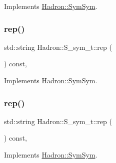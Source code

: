Implements \mbox{\hyperlink{structHadron_1_1SymSym_ae57780f41b9f6c03c6056eed3677bd48}{Hadron\+::\+Sym\+Sym}}.

\mbox{\label{structHadron_1_1S__sym__t_a1a8ccb60f6d70c9a00b8683ad8eac195}} 
\subsubsection{\texorpdfstring{rep()}{rep()}\hspace{0.1cm}{\footnotesize\ttfamily [1/5]}}
{\footnotesize\ttfamily std\+::string Hadron\+::\+S\+\_\+sym\+\_\+t\+::rep (\begin{DoxyParamCaption}{ }\end{DoxyParamCaption}) const\hspace{0.3cm}{\ttfamily [inline]}, {\ttfamily [virtual]}}



Implements \mbox{\hyperlink{structHadron_1_1SymSym_aa6e588740862036933a9efe085a5e5e5}{Hadron\+::\+Sym\+Sym}}.

\mbox{\label{structHadron_1_1S__sym__t_a1a8ccb60f6d70c9a00b8683ad8eac195}} 
\subsubsection{\texorpdfstring{rep()}{rep()}\hspace{0.1cm}{\footnotesize\ttfamily [2/5]}}
{\footnotesize\ttfamily std\+::string Hadron\+::\+S\+\_\+sym\+\_\+t\+::rep (\begin{DoxyParamCaption}{ }\end{DoxyParamCaption}) const\hspace{0.3cm}{\ttfamily [inline]}, {\ttfamily [virtual]}}



Implements \mbox{\hyperlink{structHadron_1_1SymSym_aa6e588740862036933a9efe085a5e5e5}{Hadron\+::\+Sym\+Sym}}.

\mbox{\label{structHadron_1_1S__sym__t_a1a8ccb60f6d70c9a00b8683ad8eac195}} 
